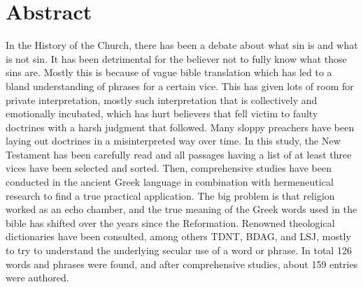 \section*{Abstract}

In the History of the Church, there has been a debate about what sin is and what is not sin.
It has been detrimental for the believer not to fully know what those sins are. Mostly this
is because of vague bible translation which has led to a bland understanding of phrases for a certain vice.
This has given lots of room for private interpretation, mostly such interpretation that is 
collectively and emotionally incubated, which has hurt believers that fell victim to faulty
doctrines with a harsh judgment that followed. Many sloppy preachers have been laying out
doctrines in a misinterpreted way over time. 
In this study, the New Testament has been carefully read and all passages having a list of
at least three vices have been selected and sorted. Then, comprehensive studies have been
conducted in the ancient Greek language in combination with hermeneutical research to find a
true practical application. The big problem is that religion worked as an echo chamber, and
the true meaning of the Greek words used in the bible has shifted over the years since the Reformation.
Renowned theological dictionaries have been consulted, among
others TDNT, BDAG, and LSJ, mostly to try to understand the underlying secular use of a
word or phrase. In total 126 words and phrases were found, and after comprehensive studies, about 159 entries were authored.



